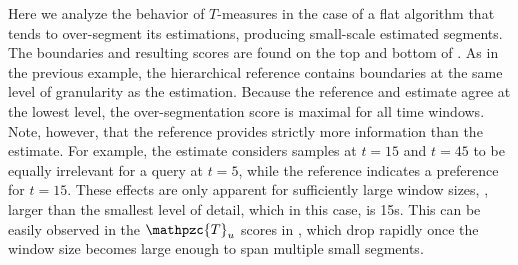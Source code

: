 \documentclass{article}
\def\shag{\ensuremath{\mathpzc{T}}}
\begin{document}
Here we analyze the behavior of $T$-measures in the case of a flat algorithm that tends to over-segment its estimations, producing small-scale estimated segments.
The boundaries and resulting scores are found on the top and bottom of .
As in the previous example, the hierarchical reference contains boundaries at the same level of granularity as the estimation. 
Because the reference and estimate agree at the lowest level, the over-segmentation score is maximal for all time windows.
Note, however, that the reference provides strictly more information than the estimate.  For example, the estimate considers samples at $t=15$ and $t=45$ to be equally irrelevant for a 
query at $t=5$, while the reference indicates a preference for $t=15$.  These effects are only apparent for sufficiently large window sizes, \eg, larger than the smallest level of
detail, which in this case, is 15s.  This can be easily observed in the $\shag_u$
scores in , which drop rapidly once the window size becomes
large enough to span multiple small segments.
\end{document}
